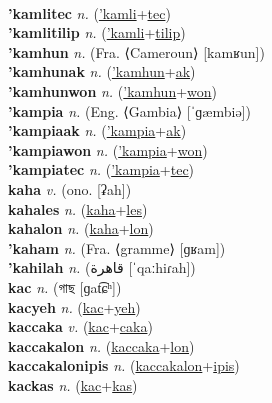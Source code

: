  \label{'kamliak} \\
\textbf{'kamlitec} \textit{n.} (\hyperref['kamli]{'kamli}+\hyperref[tec]{tec})
 \label{'kamlitec} \\
\textbf{'kamlitilip} \textit{n.} (\hyperref['kamli]{'kamli}+\hyperref[tilip]{tilip})
 \label{'kamlitilip} \\
\textbf{'kamhun} \textit{n.} (Fra. ⟨Cameroun⟩ [kamʁun])
 \label{'kamhun} \\
\textbf{'kamhunak} \textit{n.} (\hyperref['kamhun]{'kamhun}+\hyperref[ak]{ak})
 \label{'kamhunak} \\
\textbf{'kamhunwon} \textit{n.} (\hyperref['kamhun]{'kamhun}+\hyperref[won]{won})
 \label{'kamhunwon} \\
\textbf{'kampia} \textit{n.} (Eng. ⟨Gambia⟩ [ˈɡæmbiə])
 \label{'kampia} \\
\textbf{'kampiaak} \textit{n.} (\hyperref['kampia]{'kampia}+\hyperref[ak]{ak})
 \label{'kampiaak} \\
\textbf{'kampiawon} \textit{n.} (\hyperref['kampia]{'kampia}+\hyperref[won]{won})
 \label{'kampiawon} \\
\textbf{'kampiatec} \textit{n.} (\hyperref['kampia]{'kampia}+\hyperref[tec]{tec})
 \label{'kampiatec} \\
\textbf{kaha} \textit{v.} (ono. [ʡah])
 \label{kaha} \\
\textbf{kahales} \textit{n.} (\hyperref[kaha]{kaha}+\hyperref[les]{les})
 \label{kahales} \\
\textbf{kahalon} \textit{n.} (\hyperref[kaha]{kaha}+\hyperref[lon]{lon})
 \label{kahalon} \\
\textbf{'kaham} \textit{n.} (Fra. ⟨gramme⟩ [ɡʁam])
 \label{'kaham} \\
\textbf{'kahilah} \textit{n.} ({\arabics{}قاهرة} [ˈqaːhiɾah])
 \label{'kahilah} \\
\textbf{kac} \textit{n.} ({\bengali{}গাছ} [ɡat͡ɕʰ])
 \label{kac} \\
\textbf{kacyeh} \textit{n.} (\hyperref[kac]{kac}+\hyperref[yeh]{yeh})
 \label{kacyeh} \\
\textbf{kaccaka} \textit{v.} (\hyperref[kac]{kac}+\hyperref[caka]{caka})
 \label{kaccaka} \\
\textbf{kaccakalon} \textit{n.} (\hyperref[kaccaka]{kaccaka}+\hyperref[lon]{lon})
 \label{kaccakalon} \\
\textbf{kaccakalonipis} \textit{n.} (\hyperref[kaccakalon]{kaccakalon}+\hyperref[ipis]{ipis})
 \label{kaccakalonipis} \\
\textbf{kackas} \textit{n.} (\hyperref[kac]{kac}+\hyperref[kas]{kas})
